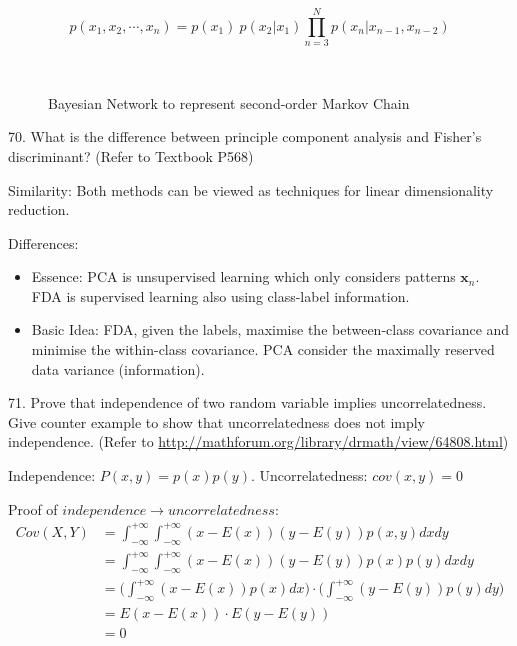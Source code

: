 \documentclass[11pt,a4paper]{article}
\newcommand{\bs}[1]{\boldsymbol{#1}}
\newcommand{\infint}{\int_{-\infty}^{+\infty}}
\begin{document}
$$ p(x_1, x_2, \cdots, x_n) = p(x_1) \ p(x_2 | x_1) \prod_{n=3}^{N} p(x_n | x_{n-1}, x_{n-2}) $$
\begin{figure}[H] \centering
{}\\[0.5cm]
\caption{Bayesian Network to represent second-order Markov Chain}
\end{figure}

70. What is the difference between principle component analysis and Fisher's discriminant? (Refer to Textbook P568)

    Similarity: Both methods can be viewed as techniques for linear dimensionality reduction.
    
    Differences:
    \begin{itemize}
        \item Essence: PCA is unsupervised learning which only considers patterns $\bs{x}_n$. FDA is supervised learning also using class-label information.
    \item Basic Idea: FDA, given the labels, maximise the between-class covariance and minimise the within-class covariance. PCA consider the maximally reserved data variance (information).
     \end{itemize}

71. Prove that independence of two random variable implies uncorrelatedness. Give counter example to show that uncorrelatedness does not imply independence. (Refer to \url{http://mathforum.org/library/drmath/view/64808.html})

    Independence: $ P (x,y) = p(x) p(y) $.  Uncorrelatedness: $ cov (x,y) = 0 $

    Proof of $independence \rightarrow uncorrelatedness$:
    \begin{align}
        Cov(X,Y) &= \infint \infint (x - E(x))(y - E(y)) p(x,y) dx dy  \\
        &= \infint \infint (x - E(x))(y - E(y))  p(x)p(y) dx dy \\
        &= \big( \infint (x - E(x)) p(x) dx \big) \cdot \big( \infint (y - E(y)) p(y) dy \big) \\
        &=  E(x - E(x)) \cdot E(y - E(y)) \\
        &=  0 
    \end{align}
\end{document}
